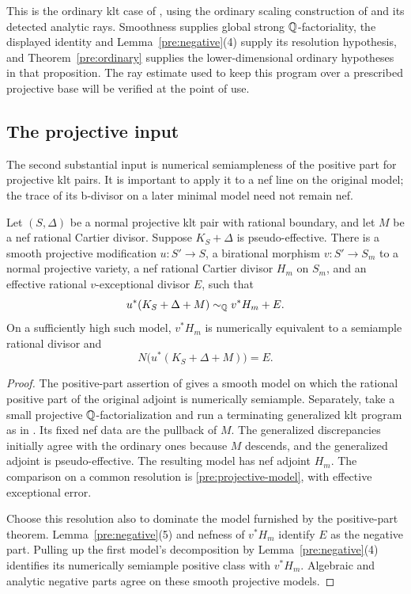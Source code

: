This is the ordinary klt case of
\cite[Proposition~3.8]{K}, using the ordinary scaling construction of
\cite[Lemma~3.6]{K} and its detected analytic rays. Smoothness supplies
global strong \(\mathbb Q\)-factoriality, the displayed identity and
Lemma~\ref{pre:negative}(4) supply its resolution hypothesis, and
Theorem~\ref{pre:ordinary} supplies the lower-dimensional ordinary
hypotheses in that proposition.
The ray estimate used to keep this program over a prescribed
projective base will be verified at the point of use.

\subsection{The projective input}

The second substantial input is numerical semiampleness of the positive
part for projective klt pairs. It is important to apply it to a nef
line on the original model; the trace of its b-divisor on a later
minimal model need not remain nef.

\begin{proposition}\label{pre:projective}
Let \((S,\Delta)\) be a normal projective klt pair with rational boundary,
and let \(M\) be a nef rational Cartier divisor. Suppose
\(K_S+\Delta\) is pseudo-effective.
There is a smooth projective modification \(u:S'\to S\), a birational
morphism \(v:S'\to S_m\) to a normal projective variety, a nef rational
Cartier divisor \(H_m\) on \(S_m\), and an effective rational
\(v\)-exceptional divisor \(E\), such that
\begin{equation}\label{pre:projective-model}
 u^*(K_S+\Delta+M)\sim_{\mathbb Q} v^*H_m+E.
\end{equation}
On a sufficiently high such model, \(v^*H_m\) is numerically equivalent
to a semiample rational divisor and
\[
 N\bigl(u^*(K_S+\Delta+M)\bigr)=E.
\]
\end{proposition}
\begin{proof}
The positive-part assertion of \cite[Proposition~8.1]{P} gives a smooth
model on which the rational positive part of the original adjoint
is numerically semiample. Separately, take a small projective
\(\mathbb Q\)-factorialization and run a terminating generalized klt program
as in \cite[Theorem~2.3]{P}. Its fixed nef data are the pullback of \(M\).
The generalized discrepancies initially agree with the ordinary ones
because \(M\) descends, and the generalized adjoint is pseudo-effective.
The resulting model has nef adjoint \(H_m\). The comparison on a common
resolution is \eqref{pre:projective-model}, with effective exceptional
error.

Choose this resolution also to dominate the model furnished by
the positive-part theorem. Lemma~\ref{pre:negative}(5) and nefness of
\(v^*H_m\) identify \(E\) as the negative part. Pulling up the first
model's decomposition by Lemma~\ref{pre:negative}(4) identifies its
numerically semiample positive class with \(v^*H_m\). Algebraic and
analytic negative parts agree on these smooth projective models.
\end{proof}

